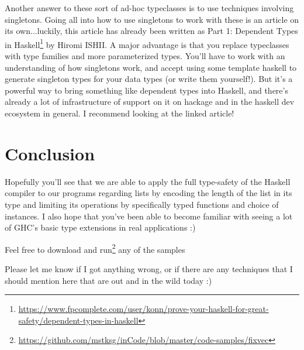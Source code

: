 \documentclass[]{article}
\renewcommand{\href}[2]{#2\footnote{\url{#1}}}
\begin{document}
Another answer to these sort of ad-hoc typeclasses is to use techniques
involving singletons. Going all into how to use singletons to work with these is
an article on its own...luckily, this article has already been written as
\href{https://www.fpcomplete.com/user/konn/prove-your-haskell-for-great-safety/dependent-types-in-haskell}{Part
1: Dependent Types in Haskell} by Hiromi ISHII. A major advantage is that you
replace typeclasses with type families and more parameterized types. You'll have
to work with an understanding of how singletons work, and accept using some
template haskell to generate singleton types for your data types (or write them
yourself!). But it's a powerful way to bring something like dependent types into
Haskell, and there's already a lot of infrastructure of support on it on hackage
and in the haskell dev ecosystem in general. I recommend looking at the linked
article!

\section{Conclusion}

Hopefully you'll see that we are able to apply the full type-safety of the
Haskell compiler to our programs regarding lists by encoding the length of the
list in its type and limiting its operations by specifically typed functions and
choice of instances. I also hope that you've been able to become familiar with
seeing a lot of GHC's basic type extensions in real applications :)

Feel free to
\href{https://github.com/mstksg/inCode/blob/master/code-samples/fixvec}{download
and run} any of the samples

Please let me know if I got anything wrong, or if there are any techniques that
I should mention here that are out and in the wild today :)
\end{document}
